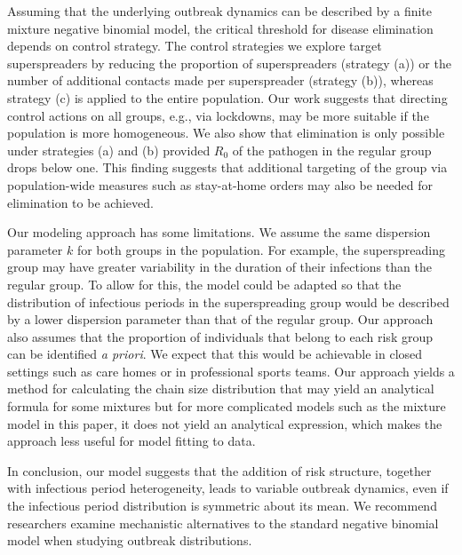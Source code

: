 \documentclass{imammb}
\numberwithin{equation}{section}
\begin{document}
Assuming that the underlying outbreak dynamics can be described by a finite mixture negative binomial model, the critical threshold for disease elimination depends on control strategy. The control strategies we explore target superspreaders by reducing the proportion of superspreaders (strategy (a)) or the number of additional contacts made per superspreader (strategy (b)), whereas strategy (c) is applied to the entire population. Our work suggests that directing control actions on all groups, e.g., via lockdowns, may be more suitable if the population is more homogeneous. We also show that elimination is only possible under strategies (a) and (b) provided $R_0$ of the pathogen in the regular group drops below one. This finding suggests that additional targeting of the group via population-wide measures such as stay-at-home orders may also be needed for elimination to be achieved. 


Our modeling approach has some limitations. We assume the same dispersion parameter $k$ for both groups in the population. For example, the superspreading group may have greater variability in the duration of their infections than the regular group. To allow for this, the model could be adapted so that the distribution of infectious periods in the superspreading group would be described by a lower dispersion parameter than that of the regular group. Our approach also assumes that the proportion of individuals that belong to each risk group can be identified \textit{a priori}. We expect that this would be achievable in closed settings such as care homes or in professional sports teams. Our approach yields a method for calculating the chain size distribution that may yield an analytical formula for some mixtures but for more complicated models such as the mixture model in this paper, it does not yield an analytical expression, which makes the approach less useful for model fitting to data.  %


In conclusion, our model suggests that the addition of risk structure, together with infectious period heterogeneity, leads to variable outbreak dynamics, even if the infectious period distribution is symmetric about its mean. We recommend researchers examine mechanistic alternatives to the standard negative binomial model when studying outbreak distributions. 


 






\newpage



\end{document}
